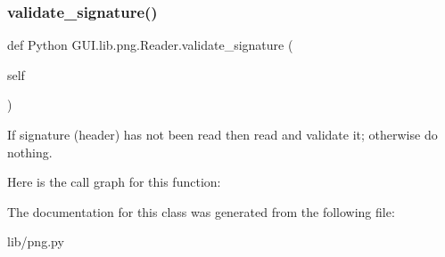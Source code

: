 \subsubsection{\texorpdfstring{validate\+\_\+signature()}{validate\_signature()}}
{\footnotesize\ttfamily def Python G\+U\+I.\+lib.\+png.\+Reader.\+validate\+\_\+signature (\begin{DoxyParamCaption}\item[{}]{self }\end{DoxyParamCaption})}

\begin{DoxyVerb}If signature (header) has not been read then read and
validate it; otherwise do nothing.
\end{DoxyVerb}
 Here is the call graph for this function\+:


The documentation for this class was generated from the following file\+:\begin{DoxyCompactItemize}
\item 
lib/png.\+py\end{DoxyCompactItemize}
